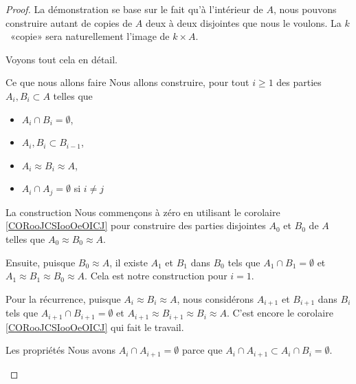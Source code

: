 \begin{proof}
    La démonstration se base sur le fait qu'à l'intérieur de \( A\), nous pouvons construire autant de copies de \( A\) deux à deux disjointes que nous le voulons. La \( k\)\ieme\ «copie» sera naturellement l'image de \( k\times A\).

    Voyons tout cela en détail.
    \begin{subproof}
        \item[Ce que nous allons faire]
            Nous allons construire, pour tout \( i\geq 1 \) des parties \( A_i,B_i\subset A\) telles que
            \begin{itemize}
                \item \( A_i\cap B_i=\emptyset\),
                \item \( A_i,B_i\subset B_{i-1}\),
                \item \( A_i\approx B_i\approx A\),
                \item \( A_i\cap A_j=\emptyset\) si \( i\neq j\)
            \end{itemize}
        \item[La construction]
            Nous commençons à zéro en utilisant le corolaire \ref{CORooJCSIooOeOICJ} pour construire des parties disjointes \( A_0\) et \( B_0\) de \( A\) telles que \( A_0\approx B_0\approx A\).

            Ensuite, puisque \( B_0\approx A\), il existe \( A_1\) et \( B_1\) dans \( B_0\) tels que \(  A_1\cap B_1=\emptyset\) et \( A_1\approx B_1\approx B_0\approx A\). Cela est notre construction pour \( i=1\).

            Pour la récurrence, puisque \( A_i\approx B_i\approx A\), nous considérons \( A_{i+1}\) et \( B_{i+1}\) dans \( B_i\) tels que \( A_{i+1}\cap B_{i+1}=\emptyset\) et \( A_{i+1}\approx B_{i+1}\approx B_i\approx A\). C'est encore le corolaire \ref{CORooJCSIooOeOICJ} qui fait le travail.

        \item[Les propriétés]
            Nous avons \( A_i\cap A_{i+1}=\emptyset\) parce que \( A_i\cap A_{i+1}\subset A_i\cap B_i=\emptyset\).


\end{subproof}
\end{proof}
